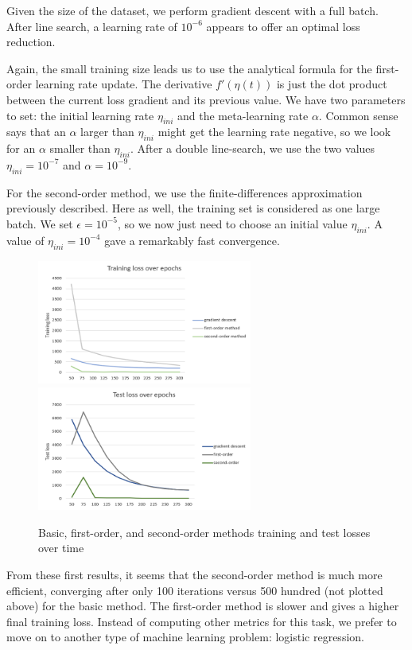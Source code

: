 \documentclass{article}
\begin{document}
  Given the size of the dataset, we perform gradient descent with a full batch. After line search, a learning rate of $10^{-6}$ appears to offer an optimal loss reduction. 
  
  Again, the small training size leads us to use the analytical formula for the first-order learning rate update. The derivative $f'(\eta(t))$ is just the dot product between the current loss gradient and its previous value. We have two parameters to set: the initial learning rate $\eta_{ini}$ and the meta-learning rate $\alpha$. Common sense says that an $\alpha$ larger than $\eta_{ini}$ might get the learning rate negative, so we look for an $\alpha$ smaller than $\eta_{ini}$. After a double line-search, we use the two values $\eta_{ini} = 10^{-7}$ and $\alpha = 10^{-9}$. 
  
  For the second-order method, we use the finite-differences approximation previously described. Here as well, the training set is considered as one large batch. We set $\epsilon=10^{-5}$, so we now just need to choose an initial value $\eta_{ini}$. A value of $\eta_{ini}=10^{-4}$ gave a remarkably fast convergence.

  \begin{figure}[!h]
	\includegraphics[width=200pt]{loss_train_linear.png}
	\includegraphics[width=200pt]{loss_test_linear.png}
	\caption{Basic, first-order, and second-order methods training and test losses over time}
  \end{figure}
  
  From these first results, it seems that the second-order method is much more efficient, converging after only 100 iterations versus 500 hundred (not plotted above) for the basic method. The first-order method is slower and gives a higher final training loss. Instead of computing other metrics for this task, we prefer to move on to another type of machine learning problem: logistic regression.
  
\end{document}
